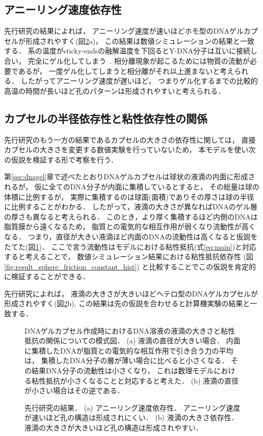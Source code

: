 \subsection{アニーリング速度依存性}

先行研究の結果によれば，
アニーリング速度が速いほどホモ型のDNAゲルカプセルが形成されやすく(図\ref{fig:result_moritasan}a)，
この結果は数値シミュレーションの結果と一致する．
系の温度がsticky-endsの融解温度を下回るとY-DNA分子は互いに接続し合い，
完全にゲル化してしまう~\cite{sato2019sequence}.
相分離現象が起こるためには物質の流動が必要であるが，
一度ゲル化してしまうと相分離がそれ以上進まないと考えられる．
したがってアニーリング速度が遅いほど，
つまりゲル化するまでの比較的高温の時間が長いほど孔のパターンは形成されやすいと考えられる．


\subsection{カプセルの半径依存性と粘性依存性の関係}

先行研究のもう一方の結果であるカプセルの大きさの依存性に関しては，
直接カプセルの大きさを変更する数値実験を行っていないため，
本モデルを使い次の仮説を検証する形で考察を行う．

第\ref{sec:dnagel}章で述べたとおりDNAゲルカプセルは球状の液滴の内面に形成されるが，
仮に全てのDNA分子が内面に集積しているとすると，
その総量は球の体積に比例するが，
実際に集積するのは球面(面積)でありその厚さは球の半径に比例することがわかる．
したがって，液滴の大きさが異なればDNAのゲル層の厚さも異なると考えられる．
このとき，より厚く集積するほど内側のDNAは脂質膜から遠くなるため，
脂質との電気的な相互作用が弱くなり流動性が高くなる．
つまり，直径が大きい液滴ほど内面のDNAの流動性は高くなると仮説をたてた(図\ref{fig:size_and_friction})．
ここで言う流動性はモデルにおける粘性抵抗(式\ref{eq:main})と対応すると考えることで，
数値シミュレーション結果における粘性抵抗依存性
(図\ref{fig:result_sphere_friction_constant_hist})
と比較することでこの仮説を肯定的に検証することができる．

先行研究によれば，
液滴の大きさが大きいほどヘテロ型のDNAゲルカプセルが形成されやすく(図\ref{fig:result_moritasan}b), 
この結果は先の仮説を合わせると計算機実験の結果と一致する．

\begin{figure}
\centering

\caption{
    DNAゲルカプセル作成時におけるDNA溶液の液滴の大きさと粘性抵抗の関係についての模式図．
    (a) 液滴の直径が大きい場合．
        内面に集積したDNAが脂質との電気的な相互作用で引き合う力の平均は，
        集積したDNA分子の層が薄い場合に比べると小さくなる．
        その結果DNA分子の流動性は小さくなり，
        これは数理モデルにおける粘性抵抗が小さくなることと対応すると考えた．
    (b) 液滴の直径が小さい場合はその逆である．
}
\label{fig:size_and_friction}
\end{figure}

\begin{figure}
\centering

\caption{
    先行研究の結果\cite{moritasan}．
    (a) アニーリング速度依存性．
        アニーリング速度が速いほど孔の構造は形成されにくい．
    (b) 液滴の大きさ依存性．
        液滴の大きさが大きいほど孔の構造は形成されやすい．
}
\label{fig:result_moritasan}
\end{figure}
